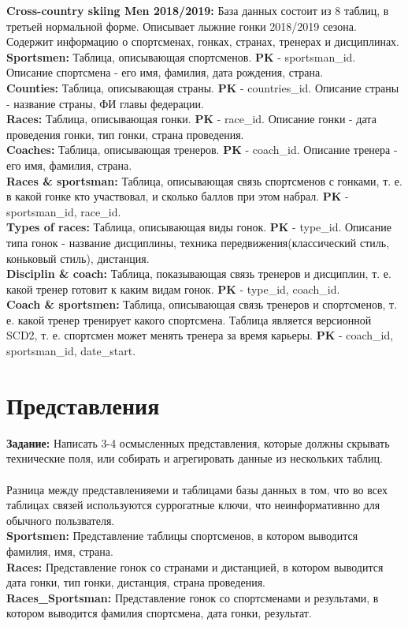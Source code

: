 \documentclass[a4paper,12pt]{article}
\begin{document}
\noindent
\textbf{Cross-country skiing Men 2018/2019:} База данных состоит из 8 таблиц, в третьей нормальной форме. Описывает лыжние гонки 2018/2019 сезона. Содержит информацию о спортсменах, гонках, странах, тренерах и дисциплинах.\\
\textbf{Sportsmen:} Таблица, описывающая спортсменов. \textbf{PK} - sportsman\_id. Описание спортсмена - его имя, фамилия, дата рождения, страна.\\
\textbf{Counties:} Таблица, описывающая страны. \textbf{PK} - countries\_id. Описание страны - название страны, ФИ главы федерации.\\
\textbf{Races:} Таблица, описывающая гонки. \textbf{PK} - race\_id. Описание гонки - дата проведения гонки, тип гонки, страна проведения.\\
\textbf{Coaches:} Таблица, описывающая тренеров. \textbf{PK} - coach\_id. Описание тренера - его имя, фамилия, страна.\\
\textbf{Races \& sportsman:} Таблица, описывающая связь спортсменов с гонками, т. е. в какой гонке кто участвовал, и сколько баллов при этом набрал. \textbf{PK} - sportsman\_id, race\_id.\\
\textbf{Types of races:} Таблица, описывающая виды гонок. \textbf{PK} - type\_id. Описание типа гонок - название дисциплины, техника передвижения(классический стиль, коньковый стиль), дистанция.\\
\textbf{Disciplin \& coach:} Таблица, показывающая связь тренеров и дисциплин, т. е. какой тренер готовит к каким видам гонок. \textbf{PK} - type\_id, coach\_id.\\
\textbf{Coach \& sportsmen:} Таблица, описывающая связь тренеров и спортсменов, т. е. какой тренер тренирует какого спортсмена. Таблица является версионной SCD2, т. е. спортсмен может менять тренера за время карьеры. \textbf{PK} - coach\_id, sportsman\_id, date\_start. 

\section{Представления}
\textbf{Задание:} Написать 3-4 осмысленных представления, которые должны скрывать технические поля, или собирать и агрегировать данные из нескольких таблиц.\\ \\
\noindent
Разница между представленияеми и таблицами базы данных в том, что во всех таблицах связей используются суррогатные ключи, что неинформативнно для обычного пользвателя.\\
\textbf{Sportsmen:} Представление таблицы спортсменов, в котором выводится фамилия, имя, страна.\\
\noindent
\textbf{Races:} Представление гонок со странами и дистанцией, в котором выводится дата гонки, тип гонки, дистанция, страна проведения.\\
\noindent
\textbf{Races\_Sportsman:} Представление гонок со спортсменами и результами, в котором выводится фамилия спортсмена, дата гонки, результат.
\end{document}
